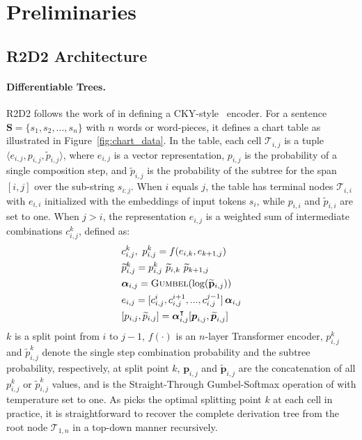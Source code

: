\section{Preliminaries}

\subsection{R2D2 Architecture}\label{sec:r2d2}

\paragraph{Differentiable Trees.} 
R2D2 follows the work of  in defining a CKY-style~\cite{10.5555/1097042,kasami1966efficient,younger1967recognition} encoder.
For a sentence $\mathbf{S} = \{s_{1}, s_{2},..., s_{n}\}$ with $n$ words or word-pieces, 
it defines a chart table as illustrated in Figure~\ref{fig:chart_data}. In the table, each cell $\mathcal{T}_{i, j}$ is a tuple $\langle e_{i, j}, p_{i, j}, \widetilde{p}_{i,j} \rangle$, where
$e_{i, j}$ is a vector representation, $p_{i, j}$ is the probability of a single composition step, 
and $\widetilde{p}_{i,j}$ is the probability of the subtree for the span $[i, j]$ over the sub-string $s_{i:j}$.
When $i$ equals $j$, the table has terminal nodes $\mathcal{T}_{i, i}$ with $e_{i, i}$ initialized with the embeddings of input tokens $s_{i}$, while
$p_{i, i}$ and $\widetilde{p}_{i,i}$ are set to one. 
When $j>i$, the representation $e_{i, j}$ is a weighted sum of intermediate combinations $c_{i, j}^{k}$, defined as: 
\begin{align}
\label{eq:tree_encoder}
&c_{i,j}^{k}, \  p_{i,j}^{k} = f(e_{i, k}, e_{k+1, j})\\
\label{eq:tree_prob}
&\widetilde{p}_{i,j}^{k} = p_{i,j}^{k} \,\, \widetilde{p}_{i,k} \,\, \widetilde{p}_{k+1,j}\\
&\boldsymbol{\alpha}_{i,j} = \text{\textsc{Gumbel}} (\log( \mathbf{\widetilde{p}}_{i,j}))\\
&e_{i,j} =  [c_{i,j}^{i}, c_{i,j}^{i+1}, ..., c_{i,j}^{j-1}]\,\boldsymbol{\alpha}_{i,j}\\
&[p_{i,j},\widetilde{p}_{i,j}] = \boldsymbol{\alpha}_{i,j}^\intercal [\boldsymbol{p}_{i,j}, \boldsymbol{\widetilde{p}}_{i,j}]
\end{align}
$k$ is a split point from $i$ to $j-1$, $f(\cdot)$ is an $n$-layer Transformer encoder,
$p_{i,j}^{k}$ and $\widetilde{p}_{i,j}^{k}$ denote the single step combination probability and the subtree probability, respectively, at split point $k$,
$\boldsymbol{p}_{i,j}$ and $\boldsymbol{\widetilde{p}}_{i,j}$ are the concatenation of all $p_{i,j}^{k}$ or $\widetilde{p}_{i,j}^{k}$ 
values, 
and \gumbel is the Straight-Through Gumbel-Softmax operation of  with temperature set to one. As \gumbel picks the optimal splitting point $k$ at each cell in practice,
it is straightforward to recover the complete derivation tree from the root node $\mathcal{T}_{1,n}$ in a top-down manner recursively.

